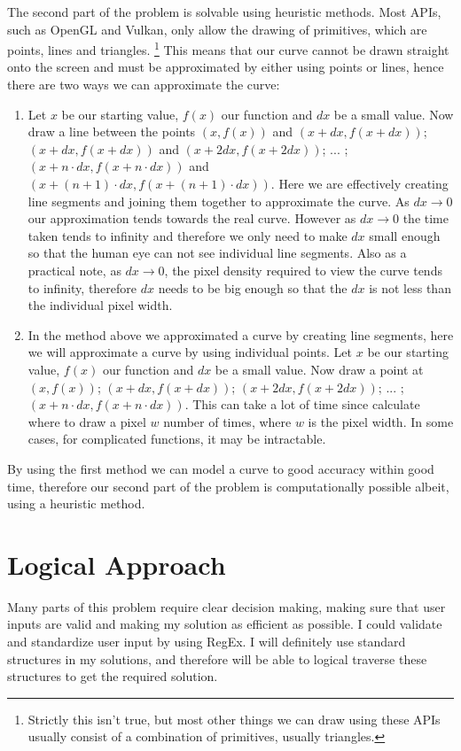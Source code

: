 \documentclass[../../../main.tex]{subfiles}
\begin{document}
The second part of the problem is solvable using heuristic methods. Most APIs, such as OpenGL\cite{opengl} and Vulkan, only allow the drawing of primitives, which are points, lines and triangles.
\footnote{Strictly this isn't true, but most other things we can draw using these APIs usually consist of a combination of primitives, usually triangles.} This means that our curve cannot be drawn straight onto the screen and must be approximated by either using points or lines, hence there are two ways we can approximate the curve:
\begin{enumerate}
\item Let $x$ be our starting value, $f(x)$ our function and $dx$ be a small value. Now draw a line between the points $(x,f(x))$ and $(x+dx,f(x+dx))$; $(x+dx,f(x+dx))$ and $(x+2dx,f(x+2dx))$; ... ;$(x+n\cdot dx,f(x+n\cdot dx))$ and $(x+(n+1)\cdot dx,f(x+(n+1)\cdot dx))$. Here we are effectively creating line segments and joining them together to approximate the curve. As $dx\to0$ our approximation tends towards the real curve. However as $dx\to0$ the time taken tends to infinity and therefore we only need to make $dx$ small enough so that the human eye can not see individual line segments. Also as a practical note, as $dx\to0$, the pixel density required to view the curve tends to infinity, therefore $dx$ needs to be big enough so that the $dx$ is not less than the individual pixel width.
\item In the method above we approximated a curve by creating line segments, here we will approximate a curve by using individual points. Let $x$ be our starting value, $f(x)$ our function and $dx$ be a small value. Now draw a point at $(x,f(x))$; $(x+dx,f(x+dx))$; $(x+2dx,f(x+2dx))$; ... ;$(x+n\cdot dx,f(x+n\cdot dx))$. This can take a lot of time since calculate where to draw a pixel $w$ number of times, where $w$ is the pixel width. In some cases, for complicated functions, it may be intractable.
\end{enumerate}
By using the first method we can model a curve to good accuracy within good time, therefore our second part of the problem is computationally possible albeit, using a heuristic method.
\newpage
\section{Logical Approach}
Many parts of this problem require clear decision making, making sure that user inputs are valid and making my solution as efficient as possible. I could validate and standardize user input by using RegEx. I will definitely use standard structures in my solutions, and therefore will be able to logical traverse these structures to get the required solution.
\end{document}

